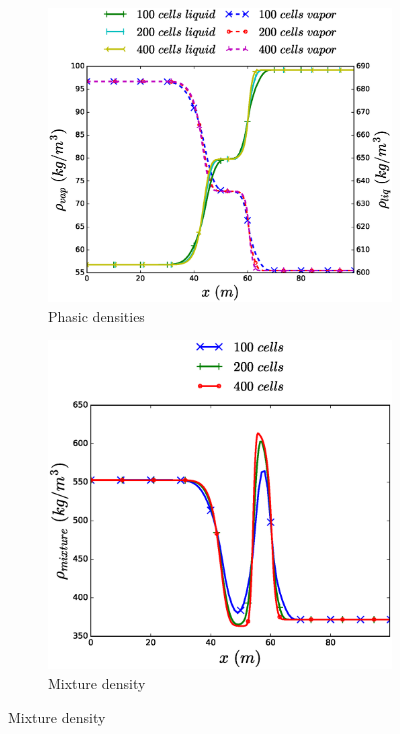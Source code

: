 \documentclass{inputs/mc2015}
\begin{document}
\begin{figure}[H]
        \vspace{-1 mm}
        \centering
        \begin{subfigure}[b]{0.49\textwidth}
                \centering
                \includegraphics[width=\textwidth]{figures/two-phase-shock-tube-hem-density-plot.eps}                
                \caption{Phasic densities}
                \label{fig:2p-shock-tube-plots-rho-hem-sa}
        \end{subfigure}%
        \begin{subfigure}[b]{0.435\textwidth}
                \centering
                \includegraphics[width=\textwidth]{figures/two-phase-shock-tube-hem-density-mixture-plot.eps}                
                \caption{Mixture density}
                \label{fig:2p-shock-tube-plots-rho-mix-hem-sa}
        \end{subfigure}%
        

\end{figure}
\end{document}
